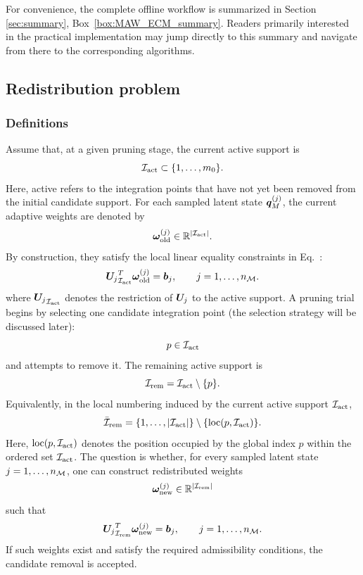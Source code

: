 \documentclass[11pt,a4paper]{article}
\newcommand{\PROMPT}[1]{ }
\begin{document}
For convenience, the complete offline workflow is summarized in Section \ref{sec:summary},
Box~\ref{box:MAW_ECM_summary}. Readers primarily interested in the
practical implementation may jump directly to this summary and navigate
from there to the corresponding algorithms.


 \subsection{Redistribution problem}
\label{sec:redistributionPR}


\subsubsection{Definitions}
%

Assume that, at a given pruning stage, the current active support is
\[
\mathcal{I}_{\mathrm{act}} \subset \{1,\ldots,m_0\}.
\]
Here, active refers to the integration points that have not yet been
removed from the initial candidate support.   For each sampled latent state \(\bm{q}_M^{(j)}\), the current adaptive
weights are denoted by
\[
\bm{\omega}^{(j)}_{\mathrm{old}}\in\mathbb{R}^{|\mathcal{I}_{\mathrm{act}}|}.
\]
By construction, they satisfy the local linear equality constraints in Eq.~:
\[
{\bm{U}_{j}}_{\mathcal{I}_{\mathrm{act}}}^{T}\bm{\omega}^{(j)}_{\mathrm{old}}
=
\bm{b}_{j},
\qquad
j=1,\ldots,n_{\mathcal{M}}.
\]
where \({\bm{U}_{j}}_{\mathcal{I}_{\mathrm{act}}}\) denotes the restriction of \(\bm{U}_{j}\) to
the active support.  A pruning trial begins by selecting one candidate integration point
(the selection strategy will be discussed later):
\[
p\in\mathcal{I}_{\mathrm{act}}
\]
and attempts to remove it. The remaining active support is
\[
\mathcal{I}_{\mathrm{rem}}
=
\mathcal{I}_{\mathrm{act}}\setminus\{p\}.
\]
Equivalently, in the local numbering induced by the current active
support \(\mathcal{I}_{\mathrm{act}}\),
\[
\mathcal{\bar{I}}_{\mathrm{rem}}
=
\{1,\ldots,|\mathcal{I}_{\mathrm{act}}|\}\setminus\{\operatorname{loc}(p,\mathcal{I}_{\mathrm{act}})\}.
\]
Here, \(\operatorname{loc}(p,\mathcal{I}_{\mathrm{act}})\) denotes the position occupied by the global
index \(p\) within the ordered set \(\mathcal{I}_{\mathrm{act}}\). The question is whether, for every sampled latent state
\(j=1,\ldots,n_{\mathcal{M}}\), one can construct redistributed weights
\[
\bm{\omega}^{(j)}_{\mathrm{new}}\in\mathbb{R}^{|\mathcal{I}_{\mathrm{rem}}|}
\]
such that
\[
{\bm{U}_{j}}^T_{\mathcal{I}_{\mathrm{rem}}}\bm{\omega}^{(j)}_{\mathrm{new}}
=
\bm{b}_{j},
\qquad
j=1,\ldots,n_{\mathcal{M}}.
\]
If such weights exist and satisfy the required admissibility conditions,
the candidate removal is accepted.



\end{document}
